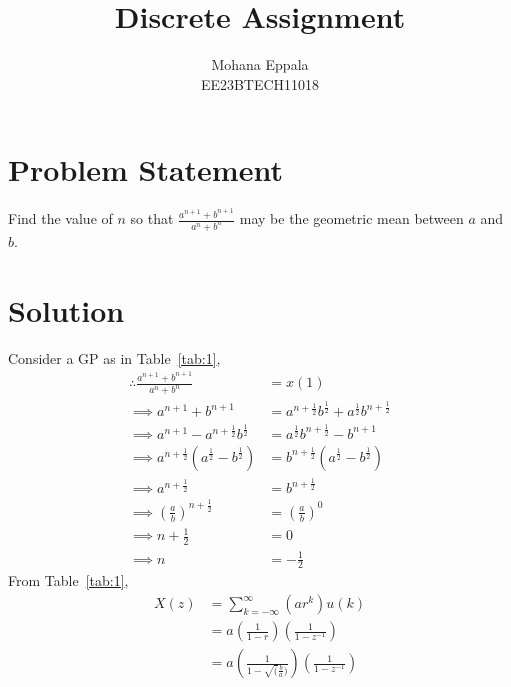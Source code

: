 \documentclass[12pt]{article}
\newcommand{\tabref}[1]{Table~\ref{#1}}
\begin{document}
\title{Discrete Assignment}
\author{Mohana Eppala\\ EE23BTECH11018}
\maketitle

\section*{Problem Statement}
Find the value of $n$ so that $\frac{a^{n+1} + b^{n+1}}{a^{n}+b^{n}}$ may be the geometric mean between $a$ and $b$.
\section{Solution}

\begin{table}[H]

\end{table}

Consider a GP as in \tabref{tab:1},
\begin{align}
	\therefore \frac{a^{n+1} + b^{n+1}}{a^{n}+b^{n}} &= x(1) \\
	\implies a^{n+1} + b^{n+1} &= a^{n+\frac{1}{2}}b^{\frac{1}{2}} + a^{\frac{1}{2}}b^{n+\frac{1}{2}} \\ 
\implies a^{n+1} - a^{n+\frac{1}{2}}b^{\frac{1}{2}} &=  a^{\frac{1}{2}}b^{n+\frac{1}{2}} - b^{n+1} \\ 
\implies a^{n+\frac{1}{2}}(a^{\frac{1}{2}} - b^{\frac{1}{2}}) &= b^{n+\frac{1}{2}}(a^{\frac{1}{2}} - b^{\frac{1}{2}}) \\     
\implies a^{n+\frac{1}{2}} &= b^{n+\frac{1}{2}} \\ 
\implies (\frac{a}{b})^{n+\frac{1}{2}} &= (\frac{a}{b})^{0} \\
\implies n + \frac{1}{2} &= 0 \\
\implies n &= -\frac{1}{2}
\end{align}
From \tabref{tab:1},
\begin{align}
	X(z) &= \sum_{k=-\infty}^{\infty} (ar^{k})u(k) \\
	&= a(\frac{1}{1-r})(\frac{1}{1-z^{-1}}) \\
	&= a(\frac{1}{1-\sqrt(\frac{b}{a})})(\frac{1}{1-z^{-1}})
\end{align}
\end{document}
